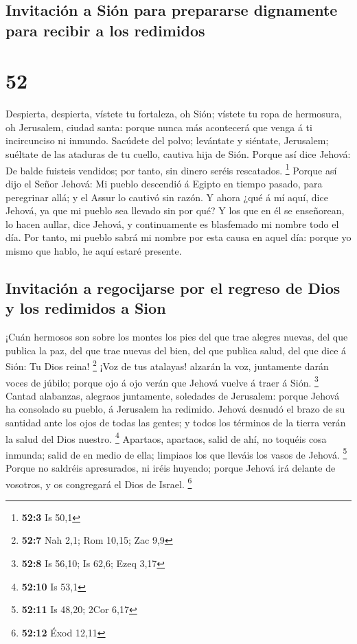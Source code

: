\hypertarget{invitaciuxf3n-a-siuxf3n-para-prepararse-dignamente-para-recibir-a-los-redimidos}{%
\subsection{Invitación a Sión para prepararse dignamente para recibir a
los
redimidos}\label{invitaciuxf3n-a-siuxf3n-para-prepararse-dignamente-para-recibir-a-los-redimidos}}

\hypertarget{section-51}{%
\section{52}\label{section-51}}

 Despierta, despierta, vístete tu fortaleza, oh Sión;
vístete tu ropa de hermosura, oh Jerusalem, ciudad santa: porque nunca
más acontecerá que venga á ti incircunciso ni inmundo. 
Sacúdete del polvo; levántate y siéntate, Jerusalem; suéltate de las
ataduras de tu cuello, cautiva hija de Sión.  Porque así
dice Jehová: De balde fuisteis vendidos; por tanto, sin dinero seréis
rescatados. \footnote{\textbf{52:3} Is 50,1}  Porque así
dijo el Señor Jehová: Mi pueblo descendió á Egipto en tiempo pasado,
para peregrinar allá; y el Assur lo cautivó sin razón.  Y
ahora ¿qué á mí aquí, dice Jehová, ya que mi pueblo sea llevado sin por
qué? Y los que en él se enseñorean, lo hacen aullar, dice Jehová, y
continuamente es blasfemado mi nombre todo el día.  Por
tanto, mi pueblo sabrá mi nombre por esta causa en aquel día: porque yo
mismo que hablo, he aquí estaré presente.

\hypertarget{invitaciuxf3n-a-regocijarse-por-el-regreso-de-dios-y-los-redimidos-a-sion}{%
\subsection{Invitación a regocijarse por el regreso de Dios y los
redimidos a
Sion}\label{invitaciuxf3n-a-regocijarse-por-el-regreso-de-dios-y-los-redimidos-a-sion}}

 ¡Cuán hermosos son sobre los montes los pies del que trae
alegres nuevas, del que publica la paz, del que trae nuevas del bien,
del que publica salud, del que dice á Sión: Tu Dios reina! \footnote{\textbf{52:7}
  Nah 2,1; Rom 10,15; Zac 9,9}  ¡Voz de tus atalayas!
alzarán la voz, juntamente darán voces de júbilo; porque ojo á ojo verán
que Jehová vuelve á traer á Sión. \footnote{\textbf{52:8} Is 56,10; Is
  62,6; Ezeq 3,17}  Cantad alabanzas, alegraos juntamente,
soledades de Jerusalem: porque Jehová ha consolado su pueblo, á
Jerusalem ha redimido.  Jehová desnudó el brazo de su
santidad ante los ojos de todas las gentes; y todos los términos de la
tierra verán la salud del Dios nuestro. \footnote{\textbf{52:10} Is 53,1}
 Apartaos, apartaos, salid de ahí, no toquéis cosa
inmunda; salid de en medio de ella; limpiaos los que lleváis los vasos
de Jehová. \footnote{\textbf{52:11} Is 48,20; 2Cor 6,17} 
Porque no saldréis apresurados, ni iréis huyendo; porque Jehová irá
delante de vosotros, y os congregará el Dios de Israel. \footnote{\textbf{52:12}
  Éxod 12,11}

